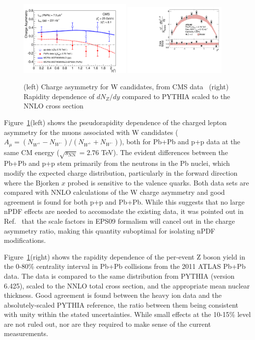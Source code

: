 \begin{figure}[t]
\begin{center}
\includegraphics[width=0.49\textwidth]{electroweak_figs/Fig3.pdf}
\includegraphics[width=0.45\textwidth]{electroweak_figs/fig_02.pdf}
\caption[]{(left) Charge asymmetry for W candidates, from CMS data~\cite{Chatrchyan:2012nt} (right) Rapidity dependence of $dN_{Z}/dy$ compared to PYTHIA scaled to the NNLO cross section~\cite{Aad:2012ew}}
\label{fig:pas:zw_eta}
\end{center}
\end{figure}
Figure~\ref{fig:pas:zw_eta}(left) shows the pseudorapidity dependence of the charged lepton asymmetry for the muons associated with 
W candidates ($A_\mu = (N_{W^+}-N_{W^-})/(N_{W^+}+N_{W^-})$), both for Pb+Pb and p+p data at the same CM energy
($\sqrt{s_\mathrm{NN}}=2.76$ TeV).  The evident differences between the Pb+Pb and p+p stem primarily from the neutrons in the
Pb nuclei, which modify the expected charge distribution, particularly in the forward direction where the Bjorken $x$ probed
is sensitive to the valence quarks.
Both data sets are compared with NNLO calculations of the W charge asymmetry and good agreement is found for both p+p and Pb+Pb.
While this suggests that no large nPDF effects are needed to accomodate the existing data, it was pointed out in Ref.~\cite{Paukkunen:2010qg}
that the scale factors in EPS09 formalism will cancel out in the charge asymmetry ratio, making this quantity suboptimal for 
isolating nPDF modifications.

Figure~\ref{fig:pas:zw_eta}(right) shows the rapidity dependence of the per-event 
Z boson yield in the 0-80\% centrality interval in Pb+Pb collisions
from the 2011 ATLAS Pb+Pb data.
The data is compared to the same distribution from PYTHIA (version 6.425), scaled to the NNLO total cross section, 
and the appropriate mean nuclear thickness.
Good agreement is found between the heavy ion data and the absolutely-scaled PYTHIA reference, the ratio between them being consistent 
with unity within the stated uncertainties.  While small effects at the 10-15\% level are not ruled out, nor are they required to 
make sense of the current measurements.

